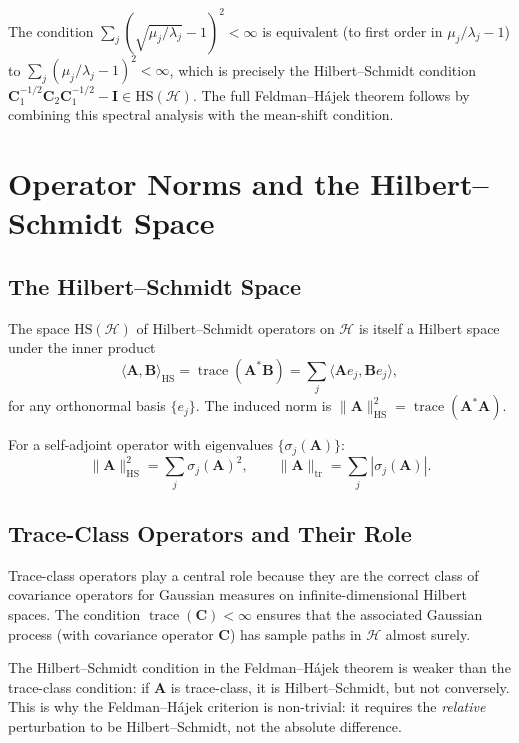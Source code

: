 \documentclass[12pt, oneside]{book}
\theoremstyle{plain}
\theoremstyle{definition}
\newcommand{\calH}{\mathcal{H}}
\newcommand{\HS}{\mathrm{HS}}
\newcommand{\tr}{\mathrm{tr}}
\DeclareMathOperator{\trace}{trace}
\begin{document}
The condition $\sum_j (\sqrt{\mu_j/\lambda_j} - 1)^2 < \infty$ is equivalent (to first order in $\mu_j/\lambda_j - 1$) to $\sum_j (\mu_j/\lambda_j - 1)^2 < \infty$, which is precisely the Hilbert--Schmidt condition $\mathbf{C}_1^{-1/2}\mathbf{C}_2 \mathbf{C}_1^{-1/2} - \mathbf{I} \in \HS(\calH)$. The full Feldman--H\'ajek theorem follows by combining this spectral analysis with the mean-shift condition.

\chapter{Operator Norms and the Hilbert--Schmidt Space}
\label{app:operators}

\section{The Hilbert--Schmidt Space}

The space $\HS(\calH)$ of Hilbert--Schmidt operators on $\calH$ is itself a Hilbert space under the inner product
\begin{equation}
\langle \mathbf{A}, \mathbf{B} \rangle_{\HS} = \trace(\mathbf{A}^* \mathbf{B}) = \sum_{j} \langle \mathbf{A}e_j, \mathbf{B}e_j \rangle,
\end{equation}
for any orthonormal basis $\{e_j\}$. The induced norm is $\|\mathbf{A}\|_{\HS}^2 = \trace(\mathbf{A}^* \mathbf{A})$.

For a self-adjoint operator with eigenvalues $\{\sigma_j(\mathbf{A})\}$:
\begin{equation}
\|\mathbf{A}\|_{\HS}^2 = \sum_j \sigma_j(\mathbf{A})^2, \qquad \|\mathbf{A}\|_{\tr} = \sum_j |\sigma_j(\mathbf{A})|.
\end{equation}

\section{Trace-Class Operators and Their Role}

Trace-class operators play a central role because they are the correct class of covariance operators for Gaussian measures on infinite-dimensional Hilbert spaces. The condition $\trace(\mathbf{C}) < \infty$ ensures that the associated Gaussian process (with covariance operator $\mathbf{C}$) has sample paths in $\calH$ almost surely.

The Hilbert--Schmidt condition in the Feldman--H\'ajek theorem is weaker than the trace-class condition: if $\mathbf{A}$ is trace-class, it is Hilbert--Schmidt, but not conversely. This is why the Feldman--H\'ajek criterion is non-trivial: it requires the \emph{relative} perturbation to be Hilbert--Schmidt, not the absolute difference.
\end{document}
